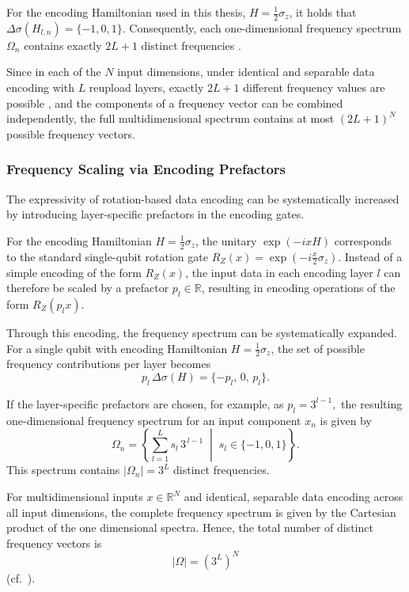 For the encoding Hamiltonian used in this thesis, $H = \tfrac12 \sigma_z$, it holds that $\Delta \sigma(H_{l,n}) = \{-1,0,1\}$. Consequently, each one-dimensional frequency spectrum $\Omega_n$ contains exactly $2L+1$ distinct frequencies \cite{schuld2021effect}.

Since in each of the $N$ input dimensions, under identical and separable data encoding with $L$ reupload layers, exactly $2L+1$ different frequency values are possible \cite{schuld2021effect,holzer2024spectral}, and the components of a frequency vector can be combined independently, the full multidimensional spectrum contains at most $(2L+1)^N$ possible frequency vectors.

\subsubsection{Frequency Scaling via Encoding Prefactors}
\label{sec:bg-vqc-frequency-scaling}

The expressivity of rotation-based data encoding can be systematically increased by introducing layer-specific prefactors in the encoding gates.

For the encoding Hamiltonian $H = \tfrac12 \sigma_z$, the unitary $\exp(-i x H)$ corresponds to the standard single-qubit rotation gate $R_Z(x) = \exp(-i \tfrac{x}{2}\sigma_z)$.
Instead of a simple encoding of the form $R_Z(x)$, the input data in each encoding layer $l$
can therefore be scaled by a prefactor $p_l \in \mathbb{R}$,
resulting in encoding operations of the form $R_Z(p_l x)$.

Through this encoding, the frequency spectrum can be systematically expanded.
For a single qubit with encoding Hamiltonian $H = \tfrac12 \sigma_z$,
the set of possible frequency contributions per layer becomes
\begin{equation}
p_l\,\Delta\sigma(H) = \{-p_l,\,0,\,p_l\}.
\end{equation}

If the layer-specific prefactors are chosen, for example, as
\(
p_l = 3^{l-1},
\)
the resulting one-dimensional frequency spectrum for an input component $x_n$ is given by
\begin{equation}
\label{eq:Omega_n}
\Omega_n
=
\left\{
\sum_{l=1}^{L} s_l\,3^{\,l-1}
\;\middle|\;
s_l \in \{-1,0,1\}
\right\}.
\end{equation}
This spectrum contains $|\Omega_n| = 3^L$ distinct frequencies.

For multidimensional inputs $x \in \mathbb{R}^N$ and identical, separable data encoding across all input dimensions, the complete frequency spectrum is given by the Cartesian product of the one dimensional spectra. Hence, the total number of distinct frequency vectors is
\[
|\Omega| = (3^L)^N
\]
(cf.~\cite{poppel2025mitigating}).


